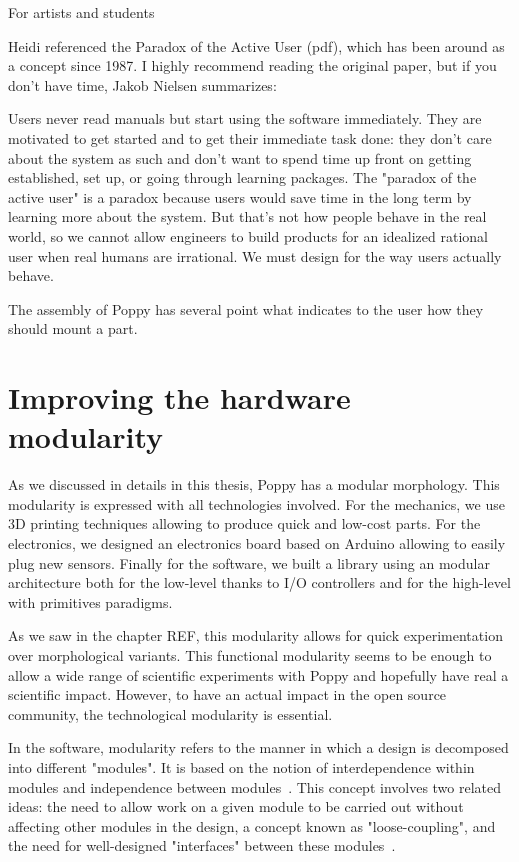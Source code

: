 For artists and students

Heidi referenced the Paradox of the Active User (pdf), which has been around as a concept since 1987. I highly recommend reading the original paper, but if you don't have time, Jakob Nielsen summarizes:

\begin{formal}
Users never read manuals but start using the software immediately. They are motivated to get started and to get their immediate task done: they don't care about the system as such and don't want to spend time up front on getting established, set up, or going through learning packages.
The "paradox of the active user" is a paradox because users would save time in the long term by learning more about the system. But that's not how people behave in the real world, so we cannot allow engineers to build products for an idealized rational user when real humans are irrational. We must design for the way users actually behave.
\end{formal}

The assembly of Poppy has several point what indicates to the user how they should mount a part.


\section{Improving the hardware modularity} %
\label{sec:improve-hardware-modularity}

As we discussed in details in this thesis, Poppy has a modular morphology. This modularity is expressed with all technologies involved. For the mechanics, we use 3D printing techniques allowing to produce quick and low-cost parts. For the electronics, we designed an electronics board based on Arduino allowing to easily plug new sensors. Finally for the software, we built a library using an modular architecture both for the low-level thanks to I/O controllers and for the high-level with primitives paradigms.

As we saw in the chapter REF, this modularity allows for quick experimentation over morphological variants. This functional modularity seems to be enough to allow a wide range of scientific experiments with Poppy and hopefully have real a scientific impact. However, to have an actual impact in the open source community, the technological modularity is essential.

In the software, modularity refers to the manner in which a design is decomposed into different "modules". It is based on the notion of interdependence within modules and independence between modules~\parencite{baldwin2000design}. This concept involves two related ideas: the need to allow work on a given module to be carried out without affecting other modules in the design, a concept known as "loose-coupling", and the need for well-designed "interfaces" between these modules~\parencite{maccormack2006exploring}.

